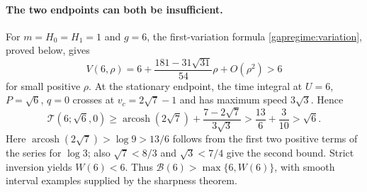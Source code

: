 \paragraph{The two endpoints can both be insufficient.}
\label{boundarygap:counterexample}
For $m=H_0=H_1=1$ and $g=6$, the first-variation formula
\eqref{gapregime:variation}, proved below, gives
\begin{equation}\label{boundarygap:small-radius}
 V(6,\rho)=6+\frac{181-31\sqrt{31}}{54}\rho+O(\rho^2)>6
\end{equation}
for small positive $\rho$. At the stationary endpoint,
the time integral at $U=6$, $P=\sqrt6$, $q=0$ crosses at
$v_c=2\sqrt7-1$ and has maximum speed $3\sqrt3$. Hence
\[
 \mathcal T(6;\sqrt6,0)
 \ge\operatorname{arcosh}(2\sqrt7)
       +\frac{7-2\sqrt7}{3\sqrt3}
 >\frac{13}{6}+\frac3{10}>\sqrt6.
\]
Here $\operatorname{arcosh}(2\sqrt7)>\log9>13/6$ follows from the
first two positive terms of the series for $\log3$; also
$\sqrt7<8/3$ and $\sqrt3<7/4$ give the second bound.
Strict inversion yields $W(6)<6$. Thus
$\mathcal B(6)>\max\{6,W(6)\}$, with smooth interval examples supplied
by the sharpness theorem.
